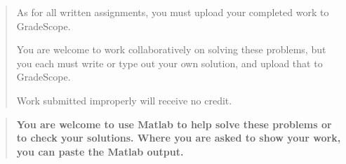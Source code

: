 \documentclass[12pt]{article}
\begin{document}

\begin{quote}
    As for all written assignments, you must upload your completed work to GradeScope.

    You are welcome to work collaboratively on solving these problems, but you each must write or type out your own solution, and upload that to GradeScope.

    Work submitted improperly will receive no credit.
\end{quote}

\begin{quote}\bf
You are welcome to use Matlab to help solve these problems or to check your solutions.  Where you are asked to show your work, you can paste the Matlab output.
\end{quote}
\end{document}
